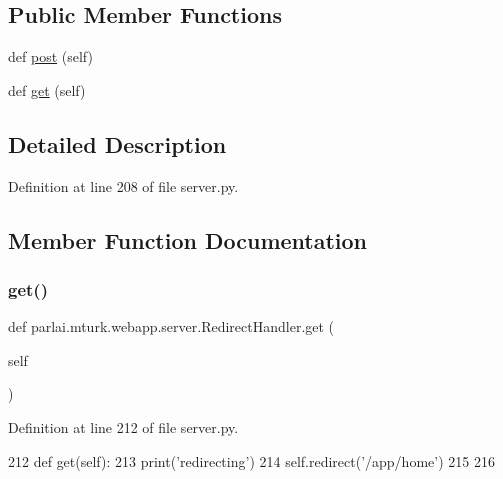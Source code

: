 \subsection*{Public Member Functions}
\begin{DoxyCompactItemize}
\item 
def \hyperlink{classparlai_1_1mturk_1_1webapp_1_1server_1_1RedirectHandler_a1b5e6edf88df4e60433ec3a8244773b6}{post} (self)
\item 
def \hyperlink{classparlai_1_1mturk_1_1webapp_1_1server_1_1RedirectHandler_a8257f43e09aae52e61eae8357db5b6ad}{get} (self)
\end{DoxyCompactItemize}


\subsection{Detailed Description}


Definition at line 208 of file server.\+py.



\subsection{Member Function Documentation}
\mbox{\label{classparlai_1_1mturk_1_1webapp_1_1server_1_1RedirectHandler_a8257f43e09aae52e61eae8357db5b6ad}} 
\subsubsection{\texorpdfstring{get()}{get()}}
{\footnotesize\ttfamily def parlai.\+mturk.\+webapp.\+server.\+Redirect\+Handler.\+get (\begin{DoxyParamCaption}\item[{}]{self }\end{DoxyParamCaption})}



Definition at line 212 of file server.\+py.


\begin{DoxyCode}
212     \textcolor{keyword}{def }get(self):
213         print(\textcolor{stringliteral}{'redirecting'})
214         self.redirect(\textcolor{stringliteral}{'/app/home'})
215 
216 
\end{DoxyCode}
\mbox{\label{classparlai_1_1mturk_1_1webapp_1_1server_1_1RedirectHandler_a1b5e6edf88df4e60433ec3a8244773b6}} 
